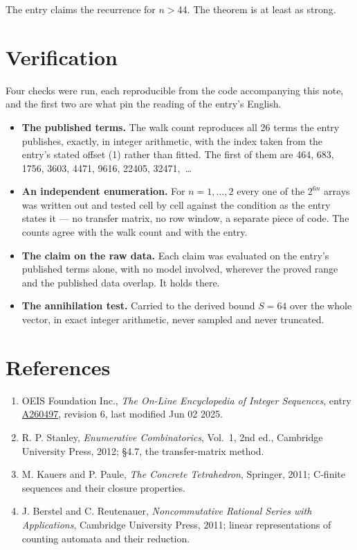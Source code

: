 \documentclass[11pt]{article}
\theoremstyle{definition}
\begin{document}
The entry claims the recurrence for $n > 44$. The theorem is at least as strong.

\section{Verification}

Four checks were run, each reproducible from the code accompanying this note, and the first two are what pin the reading of the entry's English.

\begin{itemize}

\item {\bfseries The published terms.} The walk count reproduces all 26 terms the entry publishes, exactly, in integer arithmetic, with the index taken from the entry's stated offset (1) rather than fitted. The first of them are 464, 683, 1756, 3603, 4471, 9616, 22405, 32471,~\dots

\item {\bfseries An independent enumeration.} For $n = 1,\dots,2$ every one of the $2^{6n}$ arrays was written out and tested cell by cell against the condition as the entry states it --- no transfer matrix, no row window, a separate piece of code. The counts agree with the walk count and with the entry.

\item {\bfseries The claim on the raw data.} Each claim was evaluated on the entry's published terms alone, with no model involved, wherever the proved range and the published data overlap. It holds there.

\item {\bfseries The annihilation test.} Carried to the derived bound $S = 64$ over the whole vector, in exact integer arithmetic, never sampled and never truncated.

\end{itemize}

\section{References}

\begin{enumerate}

\item OEIS Foundation Inc., \emph{The On-Line Encyclopedia of Integer Sequences}, entry \href{https://oeis.org/A260497}{A260497}, revision 6, last modified Jun 02 2025.

\item R. P. Stanley, \emph{Enumerative Combinatorics}, Vol.~1, 2nd ed., Cambridge University Press, 2012; \S4.7, the transfer-matrix method.

\item M. Kauers and P. Paule, \emph{The Concrete Tetrahedron}, Springer, 2011; C-finite sequences and their closure properties.

\item J. Berstel and C. Reutenauer, \emph{Noncommutative Rational Series with Applications}, Cambridge University Press, 2011; linear representations of counting automata and their reduction.

\end{enumerate}
\end{document}
